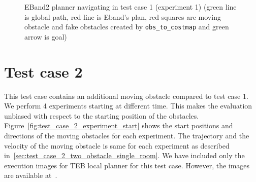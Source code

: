\begin{figure}[H]
\begin{subfigure}[b]{0.30\linewidth}
    \end{subfigure}
    \caption{EBand2 planner navigating in test case 1 (experiment 1) (green line is global path, 
    red line is Eband's plan, red squares are moving obstacle and fake obstacles created by
    \texttt{obs\_to\_costmap} and green arrow is goal)}\label{fig:eband_test_case_1_exp_1}
\end{figure}
\newpage{}
\section{Test case 2}%
\label{sec:test_case_2}

This test case contains an additional moving obstacle compared to test case 1. We perform 4 experiments 
starting at different time. This makes the evaluation unbiased with respect to
the starting position of the obstacles.  
Figure~\ref{fig:test_case_2_experiment_start} shows the start positions and directions of the moving
obstacles for each experiment. The trajectory and the velocity of the moving obstacle is same for each
experiment as described in~\ref{sec:test_case_2_two_obstacle_single_room}. We have included only the  
execution images for TEB local planner for this test case. However, the images are available at~\cite{evalimages}.

